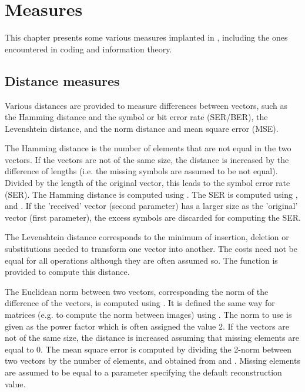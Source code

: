 \chapter{Measures}

      This chapter presents some various measures implanted in \libit,
including the ones encountered in coding and information theory.


\section{Distance measures}
   
    Various distances are provided to measure differences between
    vectors, such as the Hamming distance and the symbol or bit error
    rate (SER/BER), the Levenshtein distance, and the norm distance
    and mean square error (MSE).

    The Hamming distance is the number of elements that are not equal
    in the two vectors. If the vectors are not of the same size, the
    distance is increased by the difference of lengths (i.e. the
    missing symbols are assumed to be not equal). Divided by the
    length of the original vector, this leads to the symbol error rate
    (SER). The Hamming distance is computed using . The
    SER is computed using ,  and 
    . If the 'received' vector
    (second parameter) has a larger size as the 'original' vector
    (first parameter), the excess symbols are discarded for computing
    the SER.

    The Levenshtein distance corresponds to the minimum of insertion,
    deletion or substitutions needed to transform one vector into
    another. The costs need not be equal for all operations although
    they are often assumed so. The function
    is provided to compute this distance.

    The Euclidean norm between two vectors, corresponding the norm of
    the difference of the vectors, is computed using 
    . It is
    defined the same way for matrices (e.g. to compute the norm
    between images) using 
    . The
    norm to use is given as the power factor which is often assigned
    the value 2. If the vectors are not of the same size, the distance
    is increased assuming that missing elements are equal to 0. The
    mean square error is computed by dividing the 2-norm between two
    vectors by the number of elements, and obtained from 
     and 
    . Missing
    elements are assumed to be equal to a parameter specifying the
    default reconstruction value.
 

